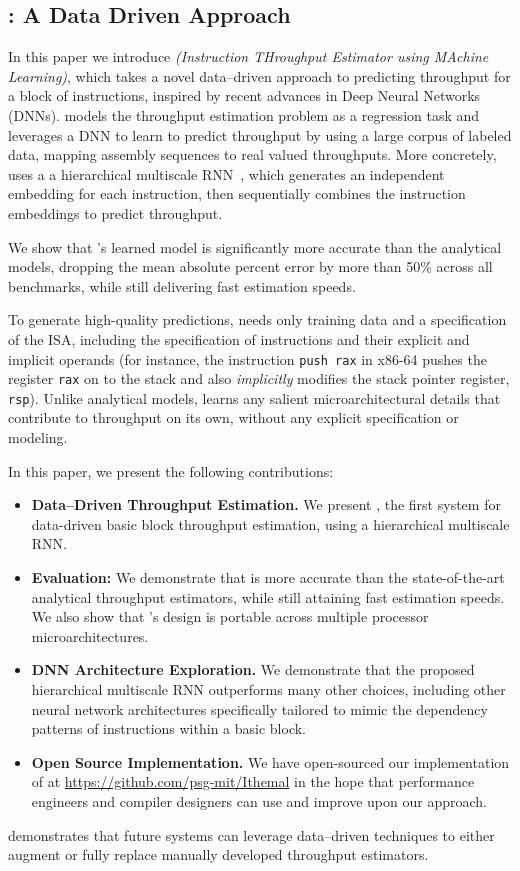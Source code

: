 \subsection{\tool{}: A Data Driven Approach}

In this paper we introduce {\it \tool{} (Instruction THroughput Estimator using MAchine Learning)}, which takes a novel data--driven approach to predicting throughput for a block of instructions, inspired by recent advances in Deep Neural Networks (DNNs).
\tool{} models the throughput estimation problem as a regression task and leverages a DNN to learn to predict throughput by using a large corpus of labeled data, mapping assembly sequences to real valued throughputs.
More concretely, \tool{} uses a a hierarchical multiscale RNN~\cite{hihi-hierarchical, chung-hierarchical, baraldi-hierarchical}, which generates an independent embedding for each instruction, then sequentially combines the instruction embeddings to predict throughput.

We show that \tool{}'s learned model is significantly more accurate than the analytical models, dropping the mean absolute percent error by more than 50\% across all benchmarks, while still delivering fast estimation speeds.

To generate high-quality predictions, \tool{} needs only training data and a specification of the ISA, including the specification of instructions and their explicit and implicit operands (for instance, the instruction \texttt{push rax} in x86-64 pushes the register \texttt{rax} on to the stack and also {\em implicitly} modifies the stack pointer register, \texttt{rsp}).
Unlike analytical models, \tool{} learns any salient microarchitectural details that contribute to throughput on its own, without any explicit specification or modeling.

In this paper, we present the following contributions:
\begin{itemize}[noitemsep]
\item{\bf Data--Driven Throughput Estimation.}
  We present \tool{}, the first system for data-driven basic block throughput estimation, using a hierarchical multiscale RNN.

\item{\bf Evaluation:}
  We demonstrate that \tool{} is more accurate than the state-of-the-art analytical throughput estimators, while still attaining fast estimation speeds.
  We also show that \tool{}'s design is portable across multiple processor microarchitectures.

\item{\bf DNN Architecture Exploration.}
  We demonstrate that the proposed hierarchical multiscale RNN outperforms many other choices, including other neural network architectures specifically tailored to mimic the dependency patterns of instructions within a basic block.

\item{\bf Open Source Implementation.}
We have open-sourced our implementation of \tool{} at \url{https://github.com/psg-mit/Ithemal} in the hope that performance engineers and compiler designers can use and improve upon our approach.

\end{itemize}

{\noindent}{\tool} demonstrates that future systems can leverage data--driven techniques to either augment or fully replace manually developed throughput estimators.
